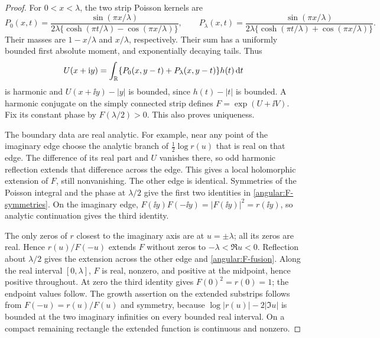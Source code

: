 \begin{proof}
For $0<x<\lambda$, the two strip Poisson kernels are
\[
 P_0(x,t)=\frac{\sin(\pi x/\lambda)}
 {2\lambda\{\cosh(\pi t/\lambda)-\cos(\pi x/\lambda)\}},\qquad
 P_\lambda(x,t)=\frac{\sin(\pi x/\lambda)}
 {2\lambda\{\cosh(\pi t/\lambda)+\cos(\pi x/\lambda)\}}.
\]
Their masses are $1-x/\lambda$ and $x/\lambda$, respectively.  Their
sum has a uniformly bounded first absolute moment, and exponentially
decaying tails.  Thus
\[
 U(x+\mathrm i y)=\int_\mathbb R
       \{P_0(x,y-t)+P_\lambda(x,y-t)\}h(t)\,\mathrm d t
\]
is harmonic and $U(x+\ii y)-|y|$ is bounded, since $h(t)-|t|$ is
bounded.  A harmonic conjugate on the simply connected strip defines
$F=\exp(U+\ii V)$.  Fix its constant phase by $F(\lambda/2)>0$.
This also proves uniqueness.

The boundary data are real analytic.  For example, near any point of
the imaginary edge choose the analytic branch of
$\tfrac12\log r(u)$ that is real on that edge.  The difference of its
real part and $U$ vanishes there, so odd harmonic reflection extends
that difference across the edge.  This gives a local holomorphic
extension of $F$, still nonvanishing.  The other edge is identical.
Symmetries of the Poisson integral and the phase at $\lambda/2$ give
the first two identities in \eqref{angular:F-symmetries}.
On the imaginary edge,
$F(\ii y)F(-\ii y)=|F(\ii y)|^2=r(\ii y)$, so analytic
continuation gives the third identity.

The only zeros of $r$ closest to the imaginary axis are at
$u=\pm\lambda$; all its zeros are real.  Hence $r(u)/F(-u)$
extends $F$ without zeros to $-\lambda<\Re u<0$.  Reflection about
$\lambda/2$ gives the extension across the other edge and
\eqref{angular:F-fusion}.  Along the real interval $[0,\lambda]$,
$F$ is real, nonzero, and positive at the midpoint, hence positive
throughout.  At zero the third identity gives $F(0)^2=r(0)=1$;
the endpoint values follow.
The growth assertion on the extended substrips follows from
$F(-u)=r(u)/F(u)$ and symmetry, because
$\log|r(u)|-2|\Im u|$ is bounded at the two imaginary infinities
on every bounded real interval.  On a compact remaining rectangle
the extended function is continuous and nonzero.
\end{proof}

